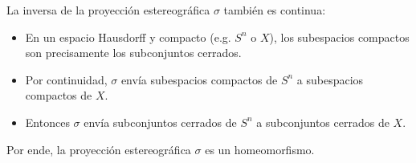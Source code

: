\begin{solution}
\begin{itemize}
    La inversa de la proyección estereográfica $\sigma$ también es continua:
    \begin{itemize}
        \item En un espacio Hausdorff y compacto (e.g. $S^n$ o $X$), los subespacios compactos son precisamente los subconjuntos cerrados.
        
        \item Por continuidad, $\sigma$ envía subespacios compactos de $S^n$ a subespacios compactos de $X$.
        
        \item Entonces $\sigma$ envía subconjuntos cerrados de $S^n$ a subconjuntos cerrados de $X$.
    \end{itemize}
    
    Por ende, la proyección estereográfica $\sigma$ es un homeomorfismo.
\end{itemize}
\end{solution}
